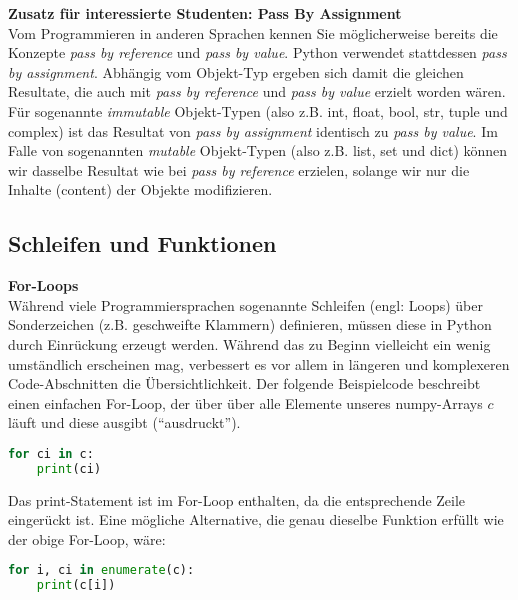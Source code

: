 \textbf{Zusatz für interessierte Studenten: Pass By Assignment} \\
 Vom Programmieren in anderen Sprachen kennen Sie möglicherweise bereits die Konzepte \textit{pass by reference} und  \textit{pass by value}. Python verwendet stattdessen \textit{pass by assignment}. Abhängig vom Objekt-Typ ergeben sich damit die gleichen Resultate, die auch mit \textit{pass by reference} und  \textit{pass by value} erzielt worden wären. Für sogenannte  \textit{immutable} Objekt-Typen (also z.B. int, float, bool, str, tuple und complex) ist das Resultat von \textit{pass by assignment} identisch zu \textit{pass by value}. Im Falle von sogenannten  \textit{mutable} Objekt-Typen (also z.B. list, set und dict) können wir dasselbe Resultat wie bei \textit{pass by reference} erzielen, solange wir nur die Inhalte (content) der Objekte modifizieren.    \\


\subsection{Schleifen und Funktionen}

\textbf{For-Loops} \\
Während viele Programmiersprachen sogenannte Schleifen (engl: Loops) über Sonderzeichen (z.B. geschweifte Klammern) definieren, müssen diese in Python durch Einrückung erzeugt werden. Während das zu Beginn vielleicht ein wenig umständlich erscheinen mag, verbessert es vor allem in längeren und komplexeren Code-Abschnitten die Übersichtlichkeit. Der folgende Beispielcode beschreibt einen einfachen For-Loop, der über über alle Elemente unseres numpy-Arrays $c$ läuft und diese ausgibt (``ausdruckt''). 
\begin{lstlisting}[language = Python]
for ci in c:
    print(ci)
\end{lstlisting}
Das print-Statement ist im For-Loop enthalten, da die entsprechende Zeile eingerückt ist. Eine mögliche Alternative, die genau dieselbe Funktion erfüllt wie der obige For-Loop, wäre:
\begin{lstlisting}[language = Python]
for i, ci in enumerate(c):
    print(c[i])
\end{lstlisting}

